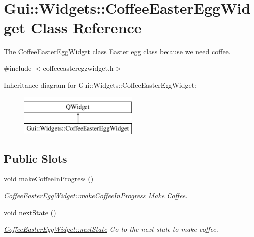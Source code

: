 \hypertarget{classGui_1_1Widgets_1_1CoffeeEasterEggWidget}{\section{Gui\-:\-:Widgets\-:\-:Coffee\-Easter\-Egg\-Widget Class Reference}
\label{classGui_1_1Widgets_1_1CoffeeEasterEggWidget}
}


The \hyperlink{classGui_1_1Widgets_1_1CoffeeEasterEggWidget}{Coffee\-Easter\-Egg\-Widget} class Easter egg class because we need coffee.  




{\ttfamily \#include $<$coffeeeastereggwidget.\-h$>$}

Inheritance diagram for Gui\-:\-:Widgets\-:\-:Coffee\-Easter\-Egg\-Widget\-:\begin{figure}[H]
\begin{center}
\leavevmode
\includegraphics[height=2.000000cm]{dc/ddf/classGui_1_1Widgets_1_1CoffeeEasterEggWidget}
\end{center}
\end{figure}
\subsection*{Public Slots}
\begin{DoxyCompactItemize}
\item 
\hypertarget{classGui_1_1Widgets_1_1CoffeeEasterEggWidget_ab078e63e3a8b1b2c363869f66e5a6633}{void \hyperlink{classGui_1_1Widgets_1_1CoffeeEasterEggWidget_ab078e63e3a8b1b2c363869f66e5a6633}{make\-Coffee\-In\-Progress} ()}\label{classGui_1_1Widgets_1_1CoffeeEasterEggWidget_ab078e63e3a8b1b2c363869f66e5a6633}

\begin{DoxyCompactList}\small\item\em \hyperlink{classGui_1_1Widgets_1_1CoffeeEasterEggWidget_ab078e63e3a8b1b2c363869f66e5a6633}{Coffee\-Easter\-Egg\-Widget\-::make\-Coffee\-In\-Progress} Make Coffee. \end{DoxyCompactList}\item 
\hypertarget{classGui_1_1Widgets_1_1CoffeeEasterEggWidget_accaae451a705877710d40fd19723df80}{void \hyperlink{classGui_1_1Widgets_1_1CoffeeEasterEggWidget_accaae451a705877710d40fd19723df80}{next\-State} ()}\label{classGui_1_1Widgets_1_1CoffeeEasterEggWidget_accaae451a705877710d40fd19723df80}

\begin{DoxyCompactList}\small\item\em \hyperlink{classGui_1_1Widgets_1_1CoffeeEasterEggWidget_accaae451a705877710d40fd19723df80}{Coffee\-Easter\-Egg\-Widget\-::next\-State} Go to the next state to make coffee. \end{DoxyCompactList}\end{DoxyCompactItemize}

